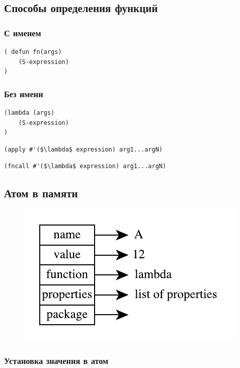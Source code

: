 \subsection{Способы определения функций}

\subsubsection{С именем}

\begin{lstlisting}
( defun fn(args)
    (S-expression)
)
\end{lstlisting}

\subsubsection{Без имени}

\begin{lstlisting}
(lambda (args)
    (S-expression)
)
\end{lstlisting}

\begin{lstlisting}
(apply #'($\lambda$ expression) arg1...argN)
\end{lstlisting}

\begin{lstlisting}
(fncall #'($\lambda$ expression) arg1...argN)
\end{lstlisting}

\subsection{Атом в памяти}

\begin{figure}[H]
    \centering
    \includegraphics[scale=1.5]{img/atom.pdf}
\end{figure}

\subsubsection{Установка значения в атом}

